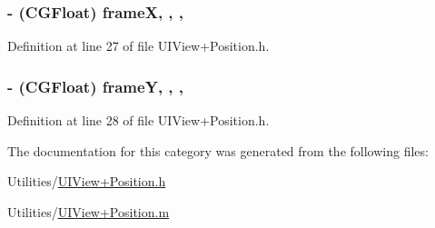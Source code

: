 \hypertarget{category_u_i_view_07_position_08_a16476712cc236d743510b2f39363396d}{
\subsubsection[{frame\+X}]{\setlength{\rightskip}{0pt plus 5cm}-\/ (C\+G\+Float) frame\+X\hspace{0.3cm}{\ttfamily [read]}, {\ttfamily [write]}, {\ttfamily [nonatomic]}, {\ttfamily [assign]}}}\label{category_u_i_view_07_position_08_a16476712cc236d743510b2f39363396d}


Definition at line 27 of file U\+I\+View+\+Position.\+h.

\hypertarget{category_u_i_view_07_position_08_a60a2692ff93131e7bbba22ecf3726f55}{
\subsubsection[{frame\+Y}]{\setlength{\rightskip}{0pt plus 5cm}-\/ (C\+G\+Float) frame\+Y\hspace{0.3cm}{\ttfamily [read]}, {\ttfamily [write]}, {\ttfamily [nonatomic]}, {\ttfamily [assign]}}}\label{category_u_i_view_07_position_08_a60a2692ff93131e7bbba22ecf3726f55}


Definition at line 28 of file U\+I\+View+\+Position.\+h.



The documentation for this category was generated from the following files\+:\begin{DoxyCompactItemize}
\item 
Utilities/\hyperlink{_u_i_view_09_position_8h}{U\+I\+View+\+Position.\+h}\item 
Utilities/\hyperlink{_u_i_view_09_position_8m}{U\+I\+View+\+Position.\+m}\end{DoxyCompactItemize}
